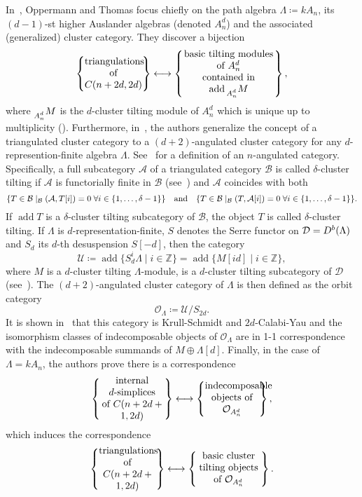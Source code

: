 \documentclass[a4paper,oneside,svgnames]{amsart}
\theoremstyle{plain}
\theoremstyle{definition}
\let\hom\relax
\let\mod\relax
\DeclareMathOperator{\add}{add}
\DeclareMathOperator{\hom}{Hom}
\DeclareMathOperator{\mod}{mod}
\newcommand{\Z}{\mathbb{Z}}
\begin{document}
 In~\cite{ot}, Oppermann and Thomas focus chiefly on the path algebra $\Lambda
 \coloneqq kA_n$, its $(d-1)$-st higher Auslander algebras (denoted $A^{d}_n$)
 and the associated (generalized) cluster category. They discover a bijection
 \[
  \left\{ 
   \parbox{.17\textwidth}{
    \centering
    triangulations of\\
    $C(n+2d,2d)$
   }
  \right\}
  \longleftrightarrow
  \left\{ 
   \parbox{.27\textwidth}{
    \centering
    basic tilting modules of $A^{d}_n$\\
    contained in $\add\prescript{}{A^{d}_n}{M}$
   }
  \right\},
 \]
 where $\prescript{}{A^{d}_n}{M}$ is the $d$-cluster tilting module of $A^{d}_n$
 which is unique up to multiplicity (\cite{iya}). Furthermore,
 in~\cite[Section~5]{ot}, the authors generalize the concept of a triangulated
 cluster category to a $(d+2)$-angulated cluster category for any
 $d$-represention-finite algebra $\Lambda$. See~\cite{gko} for a definition of
 an $n$-angulated category. Specifically, a full subcategory $\mathcal{A}$ of a
 triangulated category $\mathcal{B}$ is called $\delta$-cluster tilting if
 $\mathcal{A}$ is functorially finite in $\mathcal{B}$ (see~\cite{as}) and
 $\mathcal{A}$ coincides with both
 \[
  \{T \in \mathcal{B} \mid \hom_{\mathcal{B}}(\mathcal{A},T[i]) = 0 \; \forall
  i \in \{1,\ldots,\delta-1\}\} \quad \text{and} \quad \{T \in \mathcal{B} \mid
  \hom_{\mathcal{B}}(T,\mathcal{A}[i]) = 0 \; \forall i \in
  \{1,\ldots,\delta-1\}\}.
 \]
 If $\add T$ is a $\delta$-cluster tilting subcategory of $\mathcal{B}$, the
 object $T$ is called $\delta$-cluster tilting. If $\Lambda$ is
 $d$-representation-finite, $S$ denotes the Serre functor on $\mathcal{D} =
 D^{b}(\mod\Lambda)$ and $S_d$ its $d$-th desuspension $S[-d]$, then the
 category
 \[
  \mathcal{U} \coloneqq \add \{S^{i}_d\Lambda \mid i \in \Z\} = \add \{M[id]
  \mid i \in \Z\},
 \]
 where $M$ is a $d$-cluster tilting $\Lambda$-module, is a $d$-cluster tilting
 subcategory of $\mathcal{D}$ (see~\cite[Theorem 1.23]{iya}). The
 $(d+2)$-angulated cluster category of $\Lambda$ is then defined as the orbit
 category
 \[
  \mathcal{O}_{\Lambda} \coloneqq \mathcal{U} / S_{2d}.
 \]
 It is shown in~\cite[Theorem~5.2]{ot} that this category is Krull-Schmidt and
 $2d$-Calabi-Yau and the isomorphism classes of indecomposable objects of
 $\mathcal{O}_{\Lambda}$ are in 1-1 correspondence with the indecomposable
 summands of $M \oplus \Lambda[d]$. Finally, in the case of $\Lambda = kA_n$,
 the authors prove there is a correspondence
 \[
  \left\{ 
   \parbox{.19\textwidth}{
    \centering
    internal $d$-simplices\\
    of $C(n+2d+1,2d)$
   }
  \right\}
  \longleftrightarrow
  \left\{ 
   \parbox{.16\textwidth}{
    \centering
    indecomposable
    objects of $\mathcal{O}_{A^{d}_n}$
   }
  \right\},
 \]
 which induces the correspondence
 \[
  \left\{ 
   \parbox{.17\textwidth}{
    \centering
    triangulations of\\
    $C(n+2d+1,2d)$
   }
  \right\}
  \longleftrightarrow
  \left\{ 
   \parbox{.19\textwidth}{
    \centering
    basic cluster tilting
    objects of $\mathcal{O}_{A^{d}_n}$
   }
  \right\}.
 \]
\end{document}
